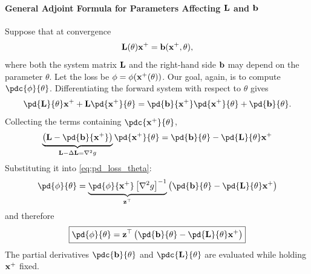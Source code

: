 \begin{derivation}
\paragraph{General Adjoint Formula for Parameters Affecting $\mathbf{L}$ and $\mathbf{b}$}
\mbox{}

\noindent Suppose that at convergence
\begin{equation*}
    \mathbf{L}(\theta)\mathbf{x}^+
    =
    \mathbf{b}(\mathbf{x}^+,\theta),
\end{equation*}
where both the system matrix $\mathbf{L}$ and the right-hand side $\mathbf{b}$ may depend on the parameter $\theta$. Let the loss be
$\phi=\phi(\mathbf{x}^+(\theta))$. Our goal, again, is to compute $\pdc{\phi}{\theta}$.
\newline Differentiating the forward system with respect to $\theta$ gives
\begin{equation}
    \pd{\LL}{\theta}\x^+
    +
    \LL
    \pd{\x^+}{\theta}
    =
    \pd{\bb}{\x^+}
    \pd{\x^+}{\theta}
    +
    \pd{\bb}{\theta}.
\end{equation}
Collecting the terms containing $\pdc{\x^+}{\theta}$,
\begin{equation}
    \underbrace{
    \left(
        \LL
        -
        \pd{\bb}{\x^+}
    \right)
    }_{\LL-\Delta\LL=\nabla^2 g}
    \pd{\x^+}{\theta}
    =
    \pd{\bb}{\theta}
    -
    \pd{\LL}{\theta}\x^+
\end{equation}
Substituting it into \eqref{eq:pd_loss_theta}:
\begin{equation}
    \pd{\phi}{\theta}
    =
    \underbrace{
    \pd{\phi}{\x^+}
    \left[\nabla^2 g\right]^{-1}
    }_{\z^\top}
    \left(
        \pd{\bb}{\theta}
        -
        \pd{\LL}{\theta}\x^+
    \right)
\end{equation}
and therefore
\begin{equation}
    \boxed{
    \pd{\phi}{\theta}
    =
    \z^\top
    \left(
        \pd{\bb}{\theta}
        -
        \pd{\LL}{\theta}\x^+
    \right)
    }
\end{equation}
The partial derivatives $\pdc{\bb}{\theta}$ and $\pdc{\LL}{\theta}$ are evaluated while holding $\mathbf{x}^+$ fixed.
\end{derivation}

